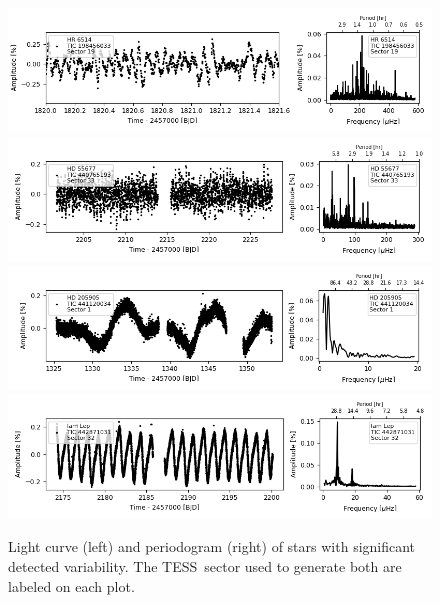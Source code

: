 \documentclass[twocolumn, linenumbers]{aastex631}
\newcommand{\tess}{TESS}
\begin{document}
\begin{figure}
\centering
    \includegraphics[width=0.9\linewidth]{figures/tic00000198456033_s019_norm1.fits}
    \includegraphics[width=0.9\linewidth]{figures/tic00000440765193_s033_flat1.fits.png}
    \includegraphics[width=0.9\linewidth]{figures/tic00000441120034_s001_normH.fits.png}
    \includegraphics[width=0.9\linewidth]{figures/tic00000442871031_s032_norm1.fits.png}

    \caption{Light curve (left) and periodogram (right) of stars with significant detected variability. The \tess\ sector used to generate both are labeled on each plot.}
    \label{fig:lcft2}
\end{figure}
\end{document}
